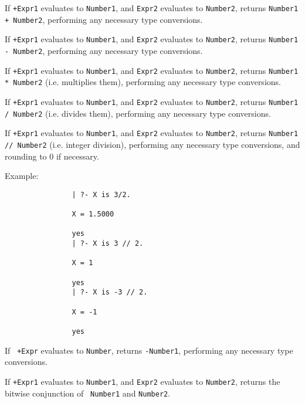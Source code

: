 \begin{description}
If {\tt +Expr1} evaluates to {\tt Number1}, and {\tt Expr2} evaluates
to {\tt Number2}, returns {\tt Number1 + Number2}, performing any
necessary type conversions.

If {\tt +Expr1} evaluates to {\tt Number1}, and {\tt Expr2} evaluates
to {\tt Number2}, returns {\tt Number1 - Number2}, performing any
necessary type conversions.

If {\tt +Expr1} evaluates to {\tt Number1}, and {\tt Expr2} evaluates
to {\tt Number2}, returns {\tt Number1 * Number2} (i.e. multiplies
them), performing any necessary type conversions.

If {\tt +Expr1} evaluates to {\tt Number1}, and {\tt Expr2} evaluates
to {\tt Number2}, returns {\tt Number1 / Number2} (i.e. divides
them), performing any necessary type conversions.

If {\tt +Expr1} evaluates to {\tt Number1}, and {\tt Expr2} evaluates
to {\tt Number2}, returns {\tt Number1 // Number2} (i.e. integer
division), performing any necessary type conversions, and rounding to
0 if necessary.  

    Example:
    {\footnotesize
     \begin{verbatim}
                | ?- X is 3/2.

                X = 1.5000

                yes
                | ?- X is 3 // 2.

                X = 1

                yes
                | ?- X is -3 // 2.

                X = -1

                yes
  \end{verbatim}}

 If {\tt
+Expr} evaluates to {\tt Number}, returns {\tt -Number1},
performing any necessary type conversions.

 If {\tt +Expr1} evaluates to {\tt Number1}, and {\tt Expr2}
evaluates to {\tt Number2}, returns the bitwise conjunction of {\tt
Number1} and {\tt Number2}.


\end{description}
